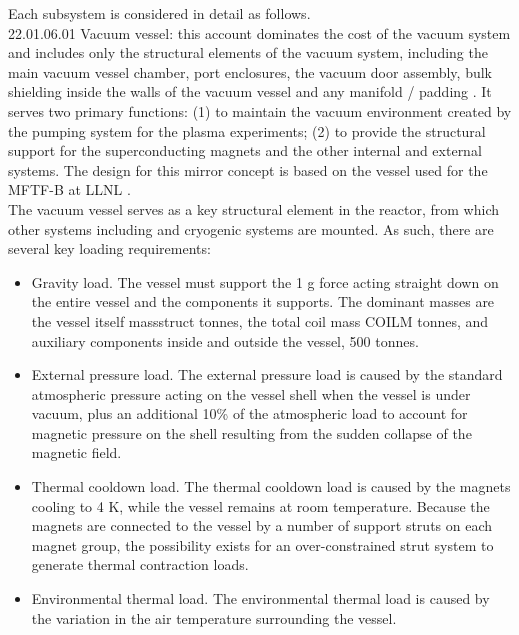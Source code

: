 Each subsystem is considered in detail as follows. \\

22.01.06.01 Vacuum vessel: this account dominates the cost of the vacuum system and includes only the structural elements of the vacuum system, including the main vacuum vessel chamber, port enclosures, the vacuum door assembly, bulk shielding inside the walls of the vacuum vessel and any manifold / padding \cite{waganer2006design}. It serves two primary functions: (1) to maintain the vacuum environment created by the pumping system for the plasma experiments; (2) to provide the structural support for the superconducting magnets and the other internal and external systems. The design for this mirror concept is based on the vessel used for the MFTF-B at LLNL \cite{gerich1986design}. \\

The vacuum vessel serves as a  key structural element in the reactor, from which other systems including and cryogenic systems are mounted.  As such, there are several key loading requirements:

\begin{itemize}
    \item Gravity load. The vessel must support the 1 g force acting straight down on the entire vessel and the components it supports. The dominant masses are the vessel itself massstruct tonnes, the total coil mass COILM tonnes, and auxiliary components inside and outside the vessel, 500 tonnes.

    \item External pressure load. The external pressure load is caused by the standard atmospheric pressure acting on the vessel shell when the vessel is under vacuum, plus an additional 10\% of the atmospheric load to account for magnetic  pressure on the shell resulting from the sudden collapse of the magnetic field. 

    \item Thermal cooldown load. The thermal cooldown load is  caused by the magnets cooling to 4 K, while the vessel remains at room temperature. Because the magnets are connected to the vessel by a number of support struts on each  magnet group, the possibility exists for an over-constrained  strut system to generate thermal contraction loads.

    \item Environmental thermal load. The environmental thermal load is caused by the variation in the air temperature surrounding the vessel.

\end{itemize}

